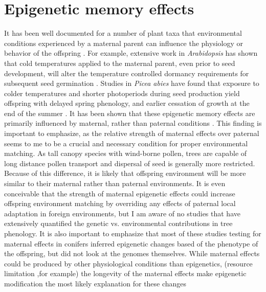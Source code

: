 \documentclass{article}\usepackage[]{graphicx}\usepackage[]{color}
\begin{document}
\section{Epigenetic memory effects}
\par It has been well documented for a number of plant taxa that environmental conditions experienced by a maternal parent can influence the physiology or behavior of the offspring \citep{Brautigam2013}. For example, extensive work in \textit{Arabidopsis} has shown that cold temperatures applied to the maternal parent, even prior to seed development, will alter the temperature controlled dormancy requirements for subsequent seed germination \citep{Auge2017}. Studies in \textit{Picea abies} have found that exposure to colder temperatures and shorter photoperiods during seed production yield offspring with delayed spring phenology, and earlier cessation of growth at the end of the summer \citep{Johnsen2005, Gomory2014}. It has been shown that these epigenetic memory effects are primarily influenced by maternal, rather than paternal conditions \citep{Brautigam2013}. This finding is important to emphasize, as the relative strength of maternal effects over paternal seems to me to be a crucial and necessary condition for proper environmental matching. As tall canopy species with wind-borne pollen, trees are capable of long distance pollen transport and dispersal of seed is generally more restricted. Because of this difference, it is likely that offspring environment will be more similar to their maternal rather than paternal environments. It is even conceivable that the strength of maternal epigenetic effects could increase offspring environment matching by overriding any effects of paternal local adaptation in foreign environments, but I am aware of no studies that have extensively quantified the  genetic vs. environmental contributions in tree phenology. It is also important to emphasize that most of these studies testing for maternal effects in conifers inferred epigenetic changes based of the phenotype of the offspring, but did not look at the genomes themselves. While maternal effects could be produced by other physiological conditions than epigenetics, (resource limitation ,for example) the longevity of the maternal effects make epigenetic modification the most likely explanation for these changes \citep{Gomory2014}
\end{document}

